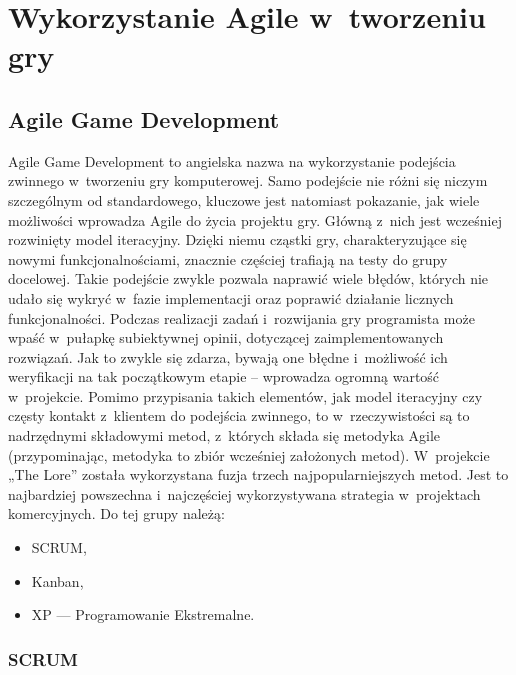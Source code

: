 \documentclass[oneside,polski,logo]{amuthesis}
\begin{document}
\section{Wykorzystanie Agile w~tworzeniu gry}
\subsection{Agile Game Development}
Agile Game Development to angielska nazwa na wykorzystanie podejścia zwinnego w~tworzeniu gry komputerowej. Samo podejście nie różni się niczym szczególnym od standardowego, kluczowe jest natomiast pokazanie, jak wiele możliwości wprowadza Agile do życia projektu gry. Główną z~nich jest wcześniej rozwinięty model iteracyjny. Dzięki niemu cząstki gry, charakteryzujące się nowymi funkcjonalnościami, znacznie częściej trafiają na testy do grupy docelowej. Takie podejście zwykle pozwala naprawić wiele błędów, których nie udało się wykryć w~fazie implementacji oraz poprawić działanie licznych funkcjonalności. Podczas realizacji zadań i~rozwijania gry programista może wpaść w~pułapkę subiektywnej opinii, dotyczącej zaimplementowanych rozwiązań. Jak to zwykle się zdarza, bywają one błędne i~możliwość ich weryfikacji na tak początkowym etapie – wprowadza ogromną wartość w~projekcie. Pomimo przypisania takich elementów, jak model iteracyjny czy częsty kontakt z~klientem do podejścia zwinnego, to w~rzeczywistości są to nadrzędnymi składowymi metod, z~których składa się metodyka Agile (przypominając, metodyka to zbiór wcześniej założonych metod). W~projekcie „The Lore” została wykorzystana fuzja trzech najpopularniejszych metod. Jest to najbardziej powszechna i~najczęściej wykorzystywana strategia w~projektach komercyjnych. \cite{Agile game}\cite{agilePract} Do tej grupy należą:

\begin{itemize}
	\item SCRUM,
	\item Kanban,
	\item XP —  Programowanie Ekstremalne.
\end{itemize}

\subsubsection{SCRUM}
\end{document}
